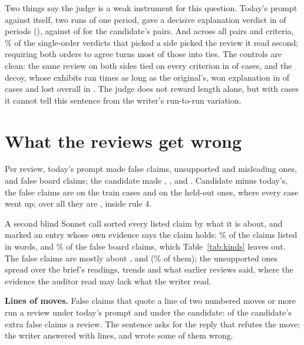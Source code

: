 \documentclass[11pt]{article}
\begin{document}
Two things say the judge is a weak instrument for this question. Today's prompt against itself,
two runs of one period, gave a decisive explanation verdict in \NullDecisive{} of \NullPairs{}
periods (\AllNullExplanation), against \CandDecided{} of \CandPairs{} for the candidate's pairs.
And across all pairs
and criteria, \SecondShare\% of the \Decided{} single-order verdicts that picked a side picked the
review it read second; requiring both orders to agree turns most of those into ties. The controls
are clean: the same review on both sides tied on every criterion in \SameN{} of \SameN{} cases, and
the decoy, whose exhibits ran \DecoyRatio{} times as long as the original's, won explanation in
\DecoyExpl{} of \DecoyN{} cases and lost overall in \DecoyLost. The judge does not reward length
alone, but with \Cases{} cases it cannot tell this sentence from the writer's run-to-run variation.

\section{What the reviews get wrong}

Per review, today's prompt made \BaseFalse{} false claims, \BaseUnsupported{} unsupported and
\BaseMisleading{} misleading ones, and \BaseBoardFalse{} false board claims; the candidate made
\CandFalse, \CandUnsupported, \CandMisleading{} and \CandBoardFalse. Candidate minus today's, the
false claims are \TrainFalseDiff{} on the train cases and \HeldFalseDiff{} on the held-out ones,
where every case went up; over all \Cases{} they are \FalseDiff, inside rule 4.

A second blind Sonnet call sorted every listed claim by what it is about, and marked an entry whose
own evidence says the claim holds: \HeldShare\% of the claims listed in words, and \HeldBoard\% of
the false board claims, which Table~\ref{tab:kinds} leaves out. The false claims are mostly about
\TopKind, \SecondKind{} and \ThirdKind{} (\TopThreeShare\% of them); the unsupported ones spread over
the brief's readings, trends and what earlier reviews said, where the evidence the auditor read may
lack what the writer read.

\begin{table}[h]
\centering
\small\KindsTable
\caption{Claims per review the audit lists, by what they are about, without those whose evidence
says they hold.}
\label{tab:kinds}
\end{table}

\textbf{Lines of moves.} False claims that quote a line of two numbered moves or more run
\BaseLineFalse{} a review under today's prompt and \CandLineFalse{} under the candidate: \ExtraLines{}
of the candidate's \ExtraFalse{} extra false claims a review. The sentence asks for the reply that
refutes the move; the writer answered with lines, and wrote some of them wrong.
\end{document}
